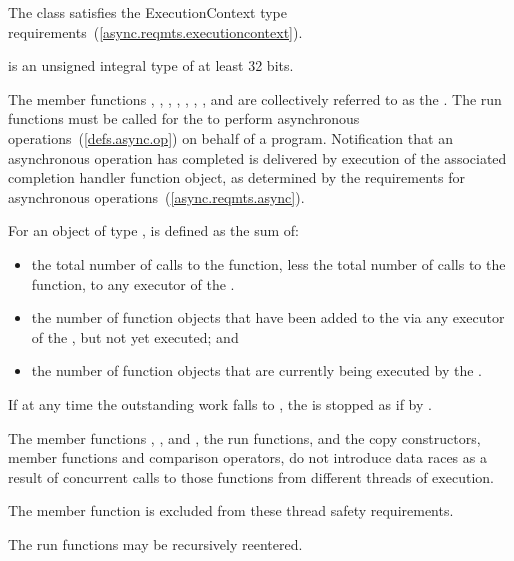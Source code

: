\pnum
The class  satisfies the ExecutionContext type requirements~(\ref{async.reqmts.executioncontext}).

%
\pnum
{} is an 
unsigned integral type of at least 32 bits.

\pnum
The  member functions , , , , , , , and  are collectively referred to as the . The run functions must be called for the  to perform asynchronous operations~(\ref{defs.async.op}) on behalf of a \Cpp program. Notification that an asynchronous operation has completed is delivered by execution of the associated completion handler function object, as determined by the requirements for asynchronous operations~(\ref{async.reqmts.async}).

\pnum
For an object of type ,  is defined as the sum of:

\begin{itemize}
\item
the total number of calls to the  function, less the total number of calls to the  function, to any executor of the .
\item
the number of function objects that have been added to the  via any executor of the , but not yet executed; and
\item
the number of function objects that are currently being executed by the .
\end{itemize}

\pnum
If at any time the outstanding work falls to , the  is stopped as if by .

\pnum
The  member functions , , and , the run functions, and the  copy constructors, member functions and comparison operators, do not introduce data races as a result of concurrent calls to those functions from different threads of execution. \begin{note} The  member function is excluded from these thread safety requirements. \end{note}
The run functions may be recursively reentered.


